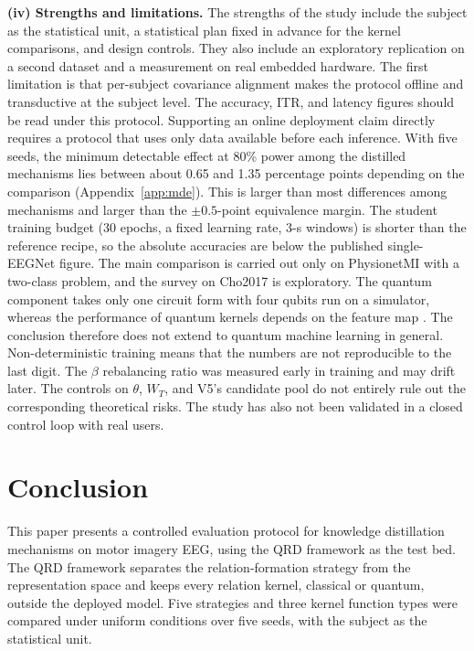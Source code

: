 \textbf{(iv) Strengths and limitations.} The strengths of the study include the subject as the statistical unit,
a statistical plan fixed in advance for the kernel comparisons, and design
controls. They also include an exploratory replication on a second dataset
and a measurement on real embedded hardware. The first limitation is that per-subject covariance alignment
makes the protocol offline and transductive at the subject level. The
accuracy, ITR, and latency figures should be read under this protocol.
Supporting an online deployment claim directly requires a protocol that
uses only data available before each inference. With five seeds, the minimum detectable effect at 80\% power among the
distilled mechanisms lies between about 0.65 and 1.35 percentage points
depending on the comparison (Appendix~\ref{app:mde}). This is larger than most
differences among mechanisms and larger than the $\pm 0.5$-point
equivalence margin. The student training budget (30 epochs, a fixed
learning rate, 3-s windows) is shorter than the reference recipe, so the
absolute accuracies are below the published single-EEGNet figure. The
main comparison is carried out
only on PhysionetMI with a two-class problem, and the survey on Cho2017
is exploratory. The quantum component takes only one circuit form with
four qubits run on a simulator, whereas the performance of quantum kernels
depends on the feature map \cite{jha2026comparative}. The conclusion
therefore does not extend to quantum machine learning in general. Non-deterministic training means
that the numbers are not reproducible to the last digit. The $\beta$
rebalancing ratio was measured early in training and may drift later.
The controls on $\theta$, $W_T$, and V5's candidate pool do not entirely
rule out the corresponding theoretical risks. The study has also not
been validated in a closed control loop with real users.

\section{Conclusion}
\label{sec:ketluan}

This paper presents a controlled evaluation protocol for knowledge
distillation mechanisms on motor imagery EEG, using the QRD framework as
the test bed. The QRD framework separates the relation-formation
strategy from the representation space and keeps every relation kernel,
classical or quantum, outside the deployed model. Five strategies and
three kernel function types were compared under uniform conditions over
five seeds, with the subject as the statistical unit.

